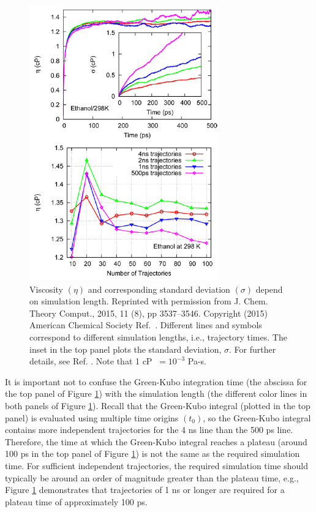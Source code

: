 \documentclass[9pt,bestpractices]{livecoms}
\begin{document}
\begin{figure}[htb!]
	\centering
	\includegraphics[width=3.2in]{ZhangFig8.png}
	\caption{Viscosity $(\eta)$ and corresponding standard deviation $(\sigma)$ depend on simulation length. Reprinted with permission from J. Chem. Theory Comput., 2015, 11 (8), pp 3537–3546. Copyright (2015) American Chemical Society Ref.\ \cite{Zhang2015}. Different lines and symbols correspond to different simulation lengths, i.e., trajectory times. The inset in the top panel plots the standard deviation, $\sigma$. For further details, see Ref. \cite{Zhang2015}. Note that 1 cP $\ = 10^{-3}$ Pa-s.}
	\label{fig:ZhangFig8}
\end{figure}

It is important not to confuse the Green-Kubo integration time (the abscissa for the top panel of Figure \ref{fig:ZhangFig8}) with the simulation length (the different color lines in both panels of Figure \ref{fig:ZhangFig8}). Recall that the Green-Kubo integral (plotted in the top panel) is evaluated using multiple time origins $(t_0)$, so the Green-Kubo integral contains more independent trajectories for the 4 ns line than the 500 ps line. Therefore, the time at which the Green-Kubo integral reaches a plateau (around 100 ps in the top panel of Figure \ref{fig:ZhangFig8}) is not the same as the required simulation time. For sufficient independent trajectories, the required simulation time should typically be around an order of magnitude greater than the plateau time, e.g., Figure \ref{fig:ZhangFig8} demonstrates that trajectories of 1 ns or longer are required for a plateau time of approximately 100 ps.
\end{document}
